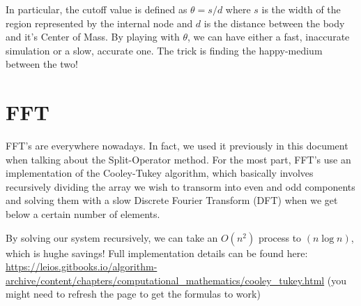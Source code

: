 \documentclass[11pt]{article}
\begin{document}
In particular, the cutoff value is defined as $\theta = s/d$ where $s$ is the width of the region represented by the internal node and $d$ is the distance between the body and it's Center of Mass. By playing with $\theta$, we can have either a fast, inaccurate simulation or a slow, accurate one. The trick is finding the happy-medium between the two!

\newpage
\section*{FFT}
FFT's are everywhere nowadays. In fact, we used it previously in this document when talking about the Split-Operator method. For the most part, FFT's use an implementation of the Cooley-Tukey algorithm, which basically involves recursively dividing the array we wish to transorm into even and odd components and solving them with a slow Discrete Fourier Transform (DFT) when we get below a certain number of elements. 

By solving our system recursively, we can take an $O(n^2)$ process to $(n\log n)$, which is hughe savings! Full implementation details can be found here: \url{https://leios.gitbooks.io/algorithm-archive/content/chapters/computational_mathematics/cooley_tukey.html} (you might need to refresh the page to get the formulas to work)
\end{document}
